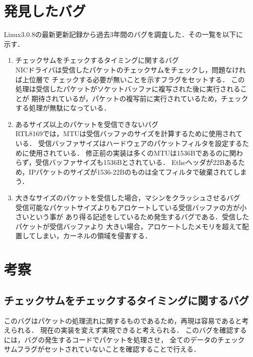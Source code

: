 \documentclass[12pt]{jsarticle}
\begin{document}
\section{発見したバグ}
Linux3.0.8の最新更新記録から過去3年間のバグを調査した．その一覧を以下に示す．
\begin{enumerate}
    \item チェックサムをチェックするタイミングに関するバグ\\
        NICドライバは受信したパケットのチェックサムをチェックし，問題なければ上位層で
        チェックする必要が無いことを示すフラグをセットする．
        この処理は受信したパケットがソケットバッファに複写された後に実行されることが
        期待されているが，パケットの複写前に実行されているため，チェックする処理が無駄になっている．

    \item あるサイズ以上のパケットを受信できないバグ\\
        RTL8169では，MTUは受信バッファのサイズを計算するために使用されている．
        受信バッファサイズはハードウェアのパケットフィルタを設定するために使用されている．
        修正前の実装は多くのMTUは1536Bであるのに関わらず，受信バッファサイズも1536Bとされている．
        Etheヘッダが22Bあるため，IPパケットのサイズが1536-22Bのものは全てフィルタで破棄されてしまう．

    \item 大きなサイズのパケットを受信した場合，マシンをクラッシュさせるバグ\\
        受信可能なパケットサイズよりもアロケートしている受信バッファの方が小さいという事が
        あり得る記述をしているため発生するバグである．受信したパケットが受信バッファより
        大きい場合，アロケートしたメモリを超えて配置してしまい，カーネルの領域を侵害する．

\end{enumerate}

\section{考察}
\subsection{チェックサムをチェックするタイミングに関するバグ}
このバグはパケットの処理流れに関するものであるため，再現は容易であると考えられる．
現在の実装を変えず実現できると考えられる．
このバグを確認するには，バグの発生するコードでパケットを処理させ，
全てのデータのチェックサムフラグがセットされていないことを確認することで行える．
\end{document}

